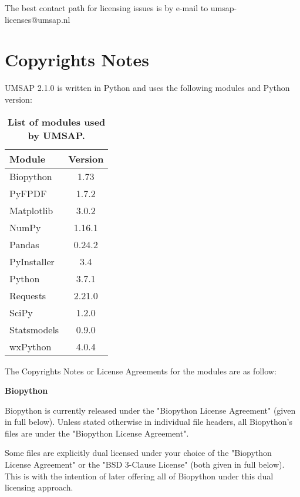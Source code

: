 The best contact path for licensing issues is by e-mail to umsap-licenses@umsap.nl

\section{Copyrights Notes}

UMSAP \num[parse-numbers=false]{2.1.0} is written in Python and uses the following modules and Python version:
\begin{table}[h!]
	\centering
	\begin{tabular}{l c}
		\hline
		Module & Version \\
		\hline
		Biopython   & \num{1.73} \\
		PyFPDF        & \num[parse-numbers=false]{1.7.2} \\
		Matplotlib    & \num[parse-numbers=false]{3.0.2} \\
		NumPy        & \num[parse-numbers=false]{1.16.1} \\
		Pandas         & \num[parse-numbers=false]{0.24.2} \\
		PyInstaller    & \num{3.4}\\
		Python         & \num[parse-numbers=false]{3.7.1}\\
		Requests      & \num[parse-numbers=false]{2.21.0}\\
		SciPy            & \num[parse-numbers=false]{1.2.0} \\
		Statsmodels & \num[parse-numbers=false]{0.9.0} \\
		wxPython     & \num[parse-numbers=false]{4.0.4}\\
		\hline		
	\end{tabular}
	\caption[List of modules used by UMSAP]{\textbf{List of modules used by UMSAP.}}
	\label{table:umsappythonmodules}
\end{table}
\newpage

The Copyrights Notes or License Agreements for the modules are as follow:

\textbf{Biopython}

Biopython is currently released under the "Biopython License Agreement" (given in full below). Unless stated otherwise in individual file headers, all Biopython's files are under the "Biopython License Agreement".

Some files are explicitly dual licensed under your choice of the "Biopython License Agreement" or the "BSD 3-Clause License" (both given in full below). This is with the intention of later offering all of Biopython under this dual licensing approach.

